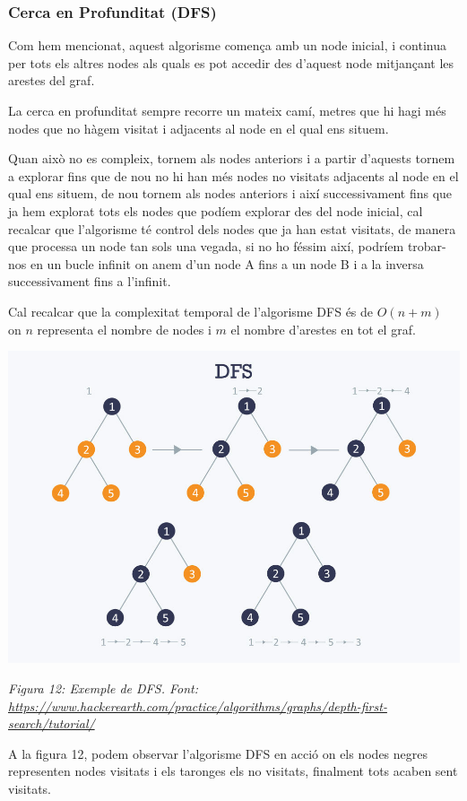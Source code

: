 \subsubsection{Cerca en Profunditat (DFS)}

Com hem mencionat, aquest algorisme comença amb un node inicial, i continua per tots els altres nodes als quals es pot accedir des d'aquest node mitjançant les arestes del graf.

La cerca en profunditat sempre recorre un mateix camí, metres que hi hagi més nodes que no hàgem visitat i adjacents al node en el qual ens situem.

Quan això no es compleix, tornem als nodes anteriors i a partir d'aquests tornem a explorar fins que de nou no hi han més nodes no visitats adjacents al node en el qual ens situem, de nou tornem als nodes anteriors i així successivament fins que ja hem explorat tots els nodes que podíem explorar des del node inicial, cal recalcar que l'algorisme té control dels nodes que ja han estat visitats, de manera que processa un node tan sols una vegada, si no ho féssim així, podríem trobar-nos en un bucle infinit on anem d'un node A fins a un node B i a la inversa successivament fins a l'infinit.

Cal recalcar que la complexitat temporal de l'algorisme DFS és de $O(n+m)$ on $n$ representa el nombre de nodes i $m$ el nombre d'arestes en tot el graf.

\begin{center}
    \includegraphics[width=.7 \textwidth]{GrafDFS.png}
    
    \caption{\emph{Figura 12: Exemple de DFS. Font: \url{https://www.hackerearth.com/practice/algorithms/graphs/depth-first-search/tutorial/}}}
\end{center}

A la figura 12, podem observar l'algorisme DFS en acció on els nodes negres representen nodes visitats i els taronges els no visitats, finalment tots acaben sent visitats. \newline

